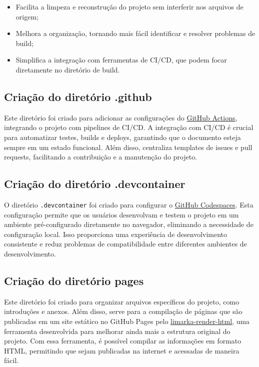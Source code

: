 \documentclass[
	12pt,				%
	oneside,			%
	a4paper,			%
	english,			%
	french,				%
	spanish,			%
	brazil				%
	]{abntex2}
\begin{document}
\begin{itemize}
\tightlist
\item
  Facilita a limpeza e reconstrução do projeto sem interferir nos
  arquivos de origem;
\item
  Melhora a organização, tornando mais fácil identificar e resolver
  problemas de build;
\item
  Simplifica a integração com ferramentas de CI/CD, que podem focar
  diretamente no diretório de build.
\end{itemize}

\hypertarget{criauxe7uxe3o-do-diretuxf3rio-.github}{%
\subsection{Criação do diretório
.github}\label{criauxe7uxe3o-do-diretuxf3rio-.github}}

Este diretório foi criado para adicionar as configurações do
\href{https://docs.github.com/pt/actions}{GitHub Actions}, integrando o
projeto com pipelines de CI/CD. A integração com CI/CD é crucial para
automatizar testes, builds e deploys, garantindo que o documento esteja
sempre em um estado funcional. Além disso, centraliza templates de
issues e pull requests, facilitando a contribuição e a manutenção do
projeto.

\hypertarget{criauxe7uxe3o-do-diretuxf3rio-.devcontainer}{%
\subsection{Criação do diretório
.devcontainer}\label{criauxe7uxe3o-do-diretuxf3rio-.devcontainer}}

O diretório \texttt{.devcontainer} foi criado para configurar o
\href{https://docs.github.com/pt/codespaces/overview}{GitHub
Codespaces}. Esta configuração permite que os usuários desenvolvam e
testem o projeto em um ambiente pré-configurado diretamente no
navegador, eliminando a necessidade de configuração local. Isso
proporciona uma experiência de desenvolvimento consistente e reduz
problemas de compatibilidade entre diferentes ambientes de
desenvolvimento.

\hypertarget{criauxe7uxe3o-do-diretuxf3rio-pages}{%
\subsection{Criação do diretório
pages}\label{criauxe7uxe3o-do-diretuxf3rio-pages}}

Este diretório foi criado para organizar arquivos específicos do
projeto, como introduções e anexos. Além disso, serve para a compilação
de páginas que são publicadas em um site estático no GitHub Pages pelo
\href{https://github.com/ReinanHS/limarka-render-html}{limarka-render-html},
uma ferramenta desenvolvida para melhorar ainda mais a estrutura
original do projeto. Com essa ferramenta, é possível compilar as
informações em formato HTML, permitindo que sejam publicadas na internet
e acessadas de maneira fácil.
\end{document}
